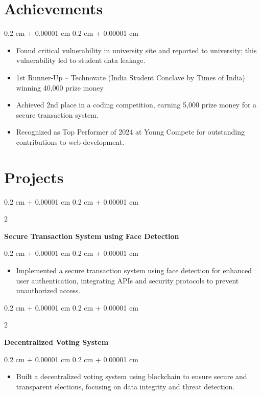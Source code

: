 \documentclass[10pt, letterpaper]{article}
\newenvironment{highlights}{
    \begin{itemize}[
        topsep=0.10 cm,
        parsep=0.10 cm,
        partopsep=0pt,
        itemsep=0pt,
        leftmargin=0.4 cm + 10pt
    ]
}{
    \end{itemize}
} %
\newenvironment{onecolentry}{
    \begin{adjustwidth}{
        0.2 cm + 0.00001 cm
    }{
        0.2 cm + 0.00001 cm
    }
}{
    \end{adjustwidth}
} %
\newenvironment{twocolentry}[2][]{
    \onecolentry
    \def\secondColumn{#2}
    \setcolumnwidth{\fill, 4.5 cm}
    \begin{paracol}{2}
}{
    \switchcolumn \raggedleft \secondColumn
    \end{paracol}
    \endonecolentry
} %
\begin{document}
    \section{Achievements}
    \begin{onecolentry}
        \begin{highlights}
            \item Found critical vulnerability in university site and reported to university; this vulnerability led to student data leakage.
            \item 1st Runner-Up – Technovate (India Student Conclave by Times of India) winning 40,000 prize money 
            \item Achieved 2nd place in a coding competition, earning 5,000 prize money for a secure transaction system.
            \item Recognized as Top Performer of 2024 at Young Compete for outstanding contributions to web development.
        \end{highlights}
    \end{onecolentry}

    \section{Projects}
    \begin{twocolentry}{}
        \textbf{Secure Transaction System using Face Detection}
    \end{twocolentry}
    \vspace{0.10 cm}
    \begin{onecolentry}
        \begin{highlights}
            \item Implemented a secure transaction system using face detection for enhanced user authentication, integrating APIs and security protocols to prevent unauthorized access.
        \end{highlights}
    \end{onecolentry}

    \vspace{0.2 cm}
    \begin{twocolentry}{}
        \textbf{Decentralized Voting System}
    \end{twocolentry}
    \vspace{0.10 cm}
    \begin{onecolentry}
        \begin{highlights}
            \item Built a decentralized voting system using blockchain to ensure secure and transparent elections, focusing on data integrity and threat detection.
        \end{highlights}
    \end{onecolentry}
\end{document}

